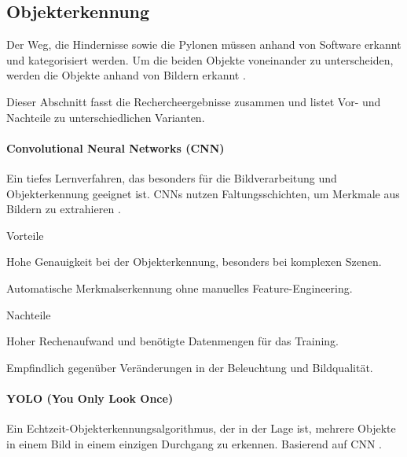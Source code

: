 \documentclass[../main.tex]{subfiles}
\begin{document}
\subsection{Objekterkennung}
\label{a2:Objekterkennung}

Der Weg, die Hindernisse sowie die Pylonen müssen anhand von Software erkannt und kategorisiert werden. Um die beiden Objekte voneinander zu unterscheiden, werden die Objekte anhand von Bildern erkannt \cite{object_detection_ibm}.

Dieser Abschnitt fasst die Rechercheergebnisse zusammen und listet Vor- und Nachteile zu unterschiedlichen Varianten.

\paragraph{Convolutional Neural Networks (CNN)}

Ein tiefes Lernverfahren, das besonders für die Bildverarbeitung und Objekterkennung geeignet ist. CNNs nutzen Faltungsschichten, um Merkmale aus Bildern zu extrahieren \cite{cnn}.

\begin{minipage}[t]{0.48\textwidth}
\begin{items}
  \item [Vorteile]
  \item Hohe Genauigkeit bei der Objekterkennung, besonders bei komplexen Szenen.
  \item Automatische Merkmalserkennung ohne manuelles Feature-Engineering.
\end{items}
\end{minipage}
\hfill
\begin{minipage}[t]{0.48\textwidth}
\begin{items}
  \item [Nachteile]
  \item Hoher Rechenaufwand und benötigte Datenmengen für das Training.
  \item Empfindlich gegenüber Veränderungen in der Beleuchtung und Bildqualität.
\end{items}
\end{minipage}

\paragraph{YOLO (You Only Look Once)}

Ein Echtzeit-Objekterkennungsalgorithmus, der in der Lage ist, mehrere Objekte in einem Bild in einem einzigen Durchgang zu erkennen. Basierend auf CNN \cite{yolo}.
\end{document}
